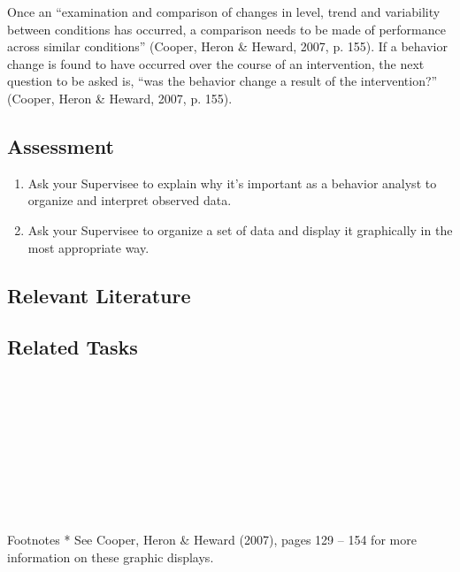 Once an ``examination and comparison of changes in level, trend and variability between conditions has occurred, a comparison needs to be made of performance across similar conditions'' (Cooper, Heron \& Heward, 2007, p. 155). If a behavior change is found to have occurred over the course of an intervention, the next question to be asked is, ``was the behavior change a result of the intervention?'' (Cooper, Heron \& Heward, 2007, p. 155).

\subsection{Assessment}
\begin{enumerate}
\item Ask your Supervisee to explain why it's important as a behavior analyst to organize and interpret observed data. 
\item Ask your Supervisee to organize a set of data and display it graphically in the most appropriate way. 
\end{enumerate}
%
\subsection{Relevant Literature}
\begin{refsection}
\nocite{cooper2007applied,
        fisher2014handbook,
        johnston1993strategies,
        parsonson1978analysis}
\printbibliography[heading=none]
\end{refsection}
%
\subsection{Related Tasks}
\fouraTen{}\\
\fouraEleven{}\\
\fourbFour{}\\
\fourbFive{}\\
\fourbSix{}\\
\fourbSeven{}\\
\fourbEight{}\\
\fourbNine{}\\
\fourjFifteen{}\\
%
Footnotes
* See Cooper, Heron \& Heward (2007), pages 129 – 154 for more information on these graphic displays.
%
\clearpage \section[\fouriSix{}]{\fouriSix{}%
              }
